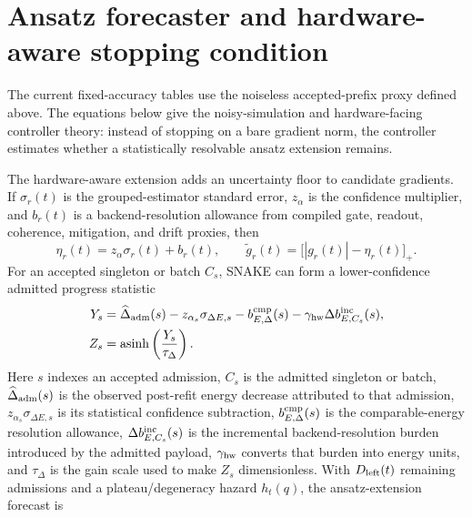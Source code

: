 \documentclass[
  reprint,
  amsmath,
  amssymb,
  aps,
  pra,
  nofootinbib,
  superscriptaddress,
  floatfix
]{revtex4-2}
\begin{document}
\section{Ansatz forecaster and hardware-aware stopping condition}
\label{app:static_controller_details}
\label{app:static_ansatz_schedule_details}
\label{app:gradient_resolution_floor}

The current fixed-accuracy tables use the noiseless accepted-prefix proxy
defined above. The equations below give the noisy-simulation and
hardware-facing controller theory: instead of stopping on a bare gradient norm,
the controller estimates whether a statistically resolvable ansatz extension
remains.

The hardware-aware extension adds an uncertainty floor to candidate gradients.  If $\sigma_r(t)$ is the grouped-estimator standard error, \(z_\alpha\) is the confidence multiplier, and $b_r(t)$ is a backend-resolution allowance from compiled gate, readout, coherence, mitigation, and drift proxies, then
\begin{equation}
\eta_r(t)=z_\alpha\sigma_r(t)+b_r(t),
\qquad
\widetilde g_r(t)=\bigl[|g_r(t)|-\eta_r(t)\bigr]_+ .
\label{eq:appendix_resolved_gradient}
\end{equation}
For an accepted singleton or batch $C_s$, SNAKE can form a lower-confidence admitted progress statistic
\begin{equation}
\begin{aligned}
Y_s&=
\widehat\Delta_{\rm adm}(s)
-z_{\alpha_s}\sigma_{\Delta E,s}
-b_{E,\Delta}^{\rm cmp}(s)
-\gamma_{\rm hw}\Delta b_{E,C_s}^{\rm inc}(s),
\\
Z_s&=\operatorname{asinh}\left(\frac{Y_s}{\tau_\Delta}\right).
\end{aligned}
\label{eq:appendix_net_admitted_gain}
\end{equation}
Here \(s\) indexes an accepted admission, \(C_s\) is the admitted singleton or batch, \(\widehat\Delta_{\rm adm}(s)\) is the observed post-refit energy decrease attributed to that admission, \(z_{\alpha_s}\sigma_{\Delta E,s}\) is its statistical confidence subtraction, \(b_{E,\Delta}^{\rm cmp}(s)\) is the comparable-energy resolution allowance, \(\Delta b_{E,C_s}^{\rm inc}(s)\) is the incremental backend-resolution burden introduced by the admitted payload, \(\gamma_{\rm hw}\) converts that burden into energy units, and \(\tau_\Delta\) is the gain scale used to make \(Z_s\) dimensionless.
With $D_{\rm left}(t)$ remaining admissions and a plateau/degeneracy hazard $h_t(q)$, the ansatz-extension forecast is
\end{document}
